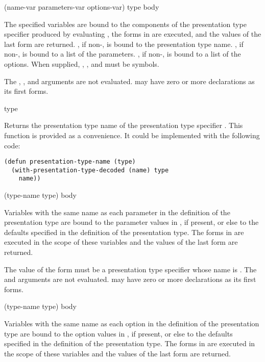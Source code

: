  {(name-var \optional parameters-var options-var) 
                                            type
                                            \body body}

The specified variables are bound to the components of the presentation type
specifier produced by evaluating , the forms in  are
executed, and the values of the last form are returned.  , if
non-, is bound to the presentation type name.  , if
non-, is bound to a list of the parameters.  , if
non-, is bound to a list of the options.  When supplied, ,
, and  must be symbols.

The , , and  arguments are
not evaluated.   may have zero or more declarations as its first
forms. 

 {type}

Returns the presentation type name of the presentation type specifier .
This function is provided as a convenience.  It could be implemented with the
following code:

\begin{verbatim}
(defun presentation-type-name (type)
  (with-presentation-type-decoded (name) type
    name))
\end{verbatim}

 {(type-name type) \body body}

Variables with the same name as each parameter in the definition of the
presentation type are bound to the parameter values in , if present,
or else to the defaults specified in the definition of the presentation type.
The forms in  are executed in the scope of these variables and the
values of the last form are returned.

The value of the form  must be a presentation type specifier whose
name is .  The  and  arguments are not
evaluated.   may have zero or more declarations as its first forms.

 {(type-name type) \body body}

Variables with the same name as each option in the definition of the
presentation type are bound to the option values in , if present, or
else to the defaults specified in the definition of the presentation type.  The
forms in  are executed in the scope of these variables and the values
of the last form are returned.

